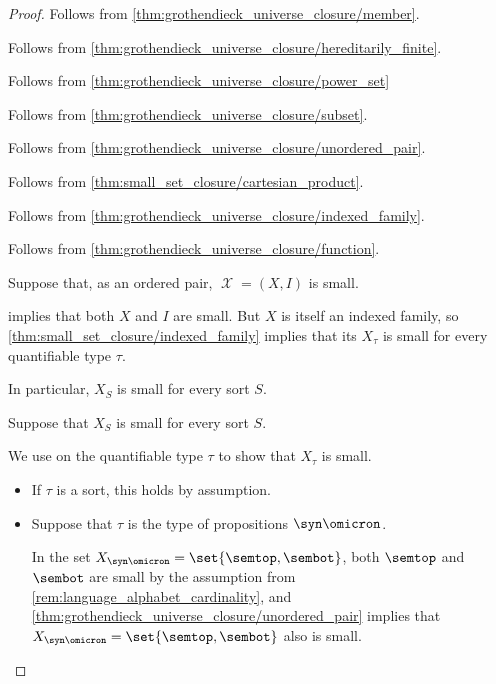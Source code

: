 \begin{proof}
   Follows from \cref{thm:grothendieck_universe_closure/member}.

   Follows from \cref{thm:grothendieck_universe_closure/hereditarily_finite}.

   Follows from \ref{thm:grothendieck_universe_closure/power_set}

   Follows from \cref{thm:grothendieck_universe_closure/subset}.

   Follows from \cref{thm:grothendieck_universe_closure/unordered_pair}.

   Follows from \cref{thm:small_set_closure/cartesian_product}.

   Follows from \cref{thm:grothendieck_universe_closure/indexed_family}.

   Follows from \cref{thm:grothendieck_universe_closure/function}.


  \SufficiencySubProof* Suppose that, as an ordered pair, \( \mscrX = (X, I) \) is small.

   implies that both \( X \) and \( I \) are small. But \( X \) is itself an indexed family, so \cref{thm:small_set_closure/indexed_family} implies that its \( X_\tau \) is small for every quantifiable type \( \tau \).

  In particular, \( X_S \) is small for every sort \( S \).

  \NecessitySubProof* Suppose that \( X_S \) is small for every sort \( S \).

  We use  on the quantifiable type \( \tau \) to show that \( X_\tau \) is small.
  \begin{itemize}
    \item If \( \tau \) is a sort, this holds by assumption.

    \item Suppose that \( \tau \) is the type of propositions \( \syn\omicron \).

    In the set \( X_{\syn\omicron} = \set{ \semtop, \sembot } \), both \( \semtop \) and \( \sembot \) are small by the assumption from \cref{rem:language_alphabet_cardinality}, and \cref{thm:grothendieck_universe_closure/unordered_pair} implies that \( X_{\syn\omicron} = \set{ \semtop, \sembot } \) also is small.


\end{itemize}
\end{proof}
